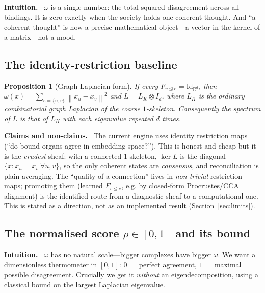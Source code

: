 \documentclass[11pt]{article}
\theoremstyle{definition}
\theoremstyle{plain}
\newtheorem{proposition}[definition]{Proposition}
\theoremstyle{remark}
\newcommand{\Intu}{\noindent\textbf{\color{intuitioncol}Intuition.}\ }
\newcommand{\Hon}{\noindent\textbf{\color{honestycol}Claims and non-claims.}\ }
\newcommand{\Kc}{K}                 %
\newcommand{\Rd}{\mathbb{R}^{d}}
\newcommand{\rest}[1]{F_{#1}}
\newcommand{\norm}[1]{\left\lVert #1 \right\rVert}
\newcommand{\triang}{\trianglelefteq}
\begin{document}
\begin{intu}\Intu
$\omega$ is a single number: the total squared disagreement across all bindings. It is
zero exactly when the society holds one coherent thought. And ``a coherent thought'' is
now a precise mathematical object---a vector in the kernel of a matrix---not a mood.
\end{intu}

\subsection{The identity-restriction baseline}

\begin{proposition}[Graph-Laplacian form]\label{prop:identity}
If every $\rest{v\triang e}=\mathrm{Id}_{\Rd}$, then
$\omega(x)=\sum_{e=\{u,v\}}\norm{x_u-x_v}^2$ and
$L=L_\Kc\otimes I_d$, where $L_\Kc$ is the ordinary combinatorial graph Laplacian of
the coarse $1$-skeleton. Consequently the spectrum of $L$ is that of $L_\Kc$ with each
eigenvalue repeated $d$ times.
\end{proposition}

\begin{hon}\Hon
The current engine uses identity restriction maps (``do bound organs agree in
embedding space?''). This is honest and cheap but it is the \emph{crudest} sheaf: with
a connected $1$-skeleton, $\ker L$ is the diagonal $\{x:x_u=x_v\ \forall u,v\}$, so the
only coherent states are \emph{consensus}, and reconciliation is plain averaging. The
``quality of a connection'' lives in \emph{non-trivial} restriction maps; promoting
them (learned $\rest{v\triang e}$, e.g. by closed-form Procrustes/CCA alignment) is the
identified route from a diagnostic sheaf to a computational one. This is stated as a
direction, not as an implemented result (Section~\ref{sec:limits}).
\end{hon}

\subsection{The normalised score \texorpdfstring{$\rho\in[0,1]$}{rho in [0,1]} and its bound}

\begin{intu}\Intu
$\omega$ has no natural scale---bigger complexes have bigger $\omega$. We want a
dimensionless thermometer in $[0,1]$: $0=$ perfect agreement, $1=$ maximal possible
disagreement. Crucially we get it \emph{without} an eigendecomposition, using a
classical bound on the largest Laplacian eigenvalue.
\end{intu}
\end{document}
